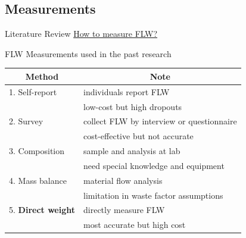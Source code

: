 \documentclass{beamer}
\begin{document}
\subsection{Measurements}
\begin{frame}{Literature Review}
    \underline{How to measure FLW?}
    \begin{block}{FLW Measurements used in the past research}
    \begin{table}[]
        \begin{tabular}{ll}
            \hline
            \multicolumn{1}{c}{Method} & \multicolumn{1}{c}{Note}            \\ \hline
                1. \small Self-report   & \footnotesize individuals report FLW                    \\
                                 & \footnotesize low-cost but high dropouts                \\
                2. \small Survey        & \footnotesize collect FLW by interview or questionnaire \\
                                 & \footnotesize cost-effective but not accurate           \\
                3. \small Composition   & \footnotesize sample and analysis at lab                \\
                                 & \footnotesize need special knowledge and equipment      \\
                4. \small Mass balance  & \footnotesize material flow analysis                    \\
                                 & \footnotesize limitation in waste factor assumptions    \\
                5. \textbf{\small Direct weight} 
                                 & \footnotesize directly measure FLW                      \\
                                 & \footnotesize most accurate but high cost         \\ \hline
        \end{tabular}
    \end{table}
    \end{block}
\end{frame}

\end{document}
